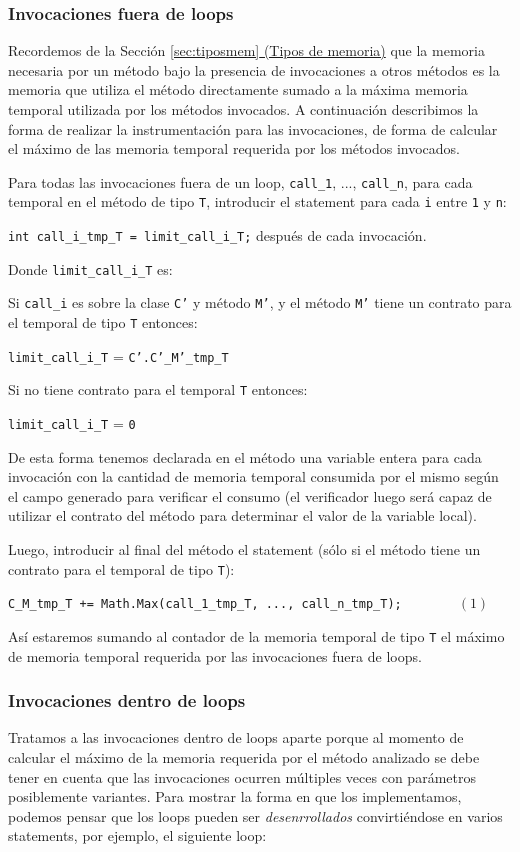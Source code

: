 \documentclass[12pt,a4paper]{article}
\newcommand\mono[1]{\texttt{#1}}
\begin{document}
			\subsubsection{Invocaciones fuera de loops} \label{sec:callsfueraloops}
				Recordemos de la Sección \hyperref[sec:tiposmem]{\ref*{sec:tiposmem} (Tipos de memoria)} que la memoria necesaria por un método bajo la presencia de invocaciones a otros métodos es la memoria que utiliza el método directamente sumado a la máxima memoria temporal utilizada por los métodos invocados. A continuación describimos la forma de realizar la instrumentación para las invocaciones, de forma de calcular el máximo de las memoria temporal requerida por los métodos invocados.

				Para todas las invocaciones fuera de un loop, \mono{call\_1}, ..., \mono{call\_n}, para cada temporal en el método de tipo \mono{T}, introducir el statement para cada \mono{i} entre \mono{1} y \mono{n}:

				\mono{int call\_i\_tmp\_T = limit\_call\_i\_T;} después de cada invocación.

				Donde \mono{limit\_call\_i\_T} es:

				Si \mono{call\_i} es sobre la clase \mono{C'} y método \mono{M'}, y el método \mono{M'} tiene un contrato para el temporal de tipo \mono{T} entonces:

				\mono{limit\_call\_i\_T} = \mono{C'.C'\_M'\_tmp\_T}

				Si no tiene contrato para el temporal \mono{T} entonces:

				\mono{limit\_call\_i\_T} = \mono{0}

				De esta forma tenemos declarada en el método una variable entera para cada invocación con la cantidad de memoria temporal consumida por el mismo según el campo generado para verificar el consumo (el verificador luego será capaz de utilizar el contrato del método para determinar el valor de la variable local).

				Luego, introducir al final del método el statement (sólo si el método tiene un contrato para el temporal de tipo \mono{T}):

				\mono{C\_M\_tmp\_T += Math.Max(call\_1\_tmp\_T, ..., call\_n\_tmp\_T);}\ \ \ \ \ \ \ \ $(1)$

				Así estaremos sumando al contador de la memoria temporal de tipo \mono{T} el máximo de memoria temporal requerida por las invocaciones fuera de loops.
			\subsubsection{Invocaciones dentro de loops} \label{sec:callsloops}
				Tratamos a las invocaciones dentro de loops aparte porque al momento de calcular el máximo de la memoria requerida por el método analizado se debe tener en cuenta que las invocaciones ocurren múltiples veces con parámetros posiblemente variantes. Para mostrar la forma en que los implementamos, podemos pensar que los loops pueden ser \textit{desenrrollados} convirtiéndose en varios statements, por ejemplo, el siguiente loop:
\end{document}
